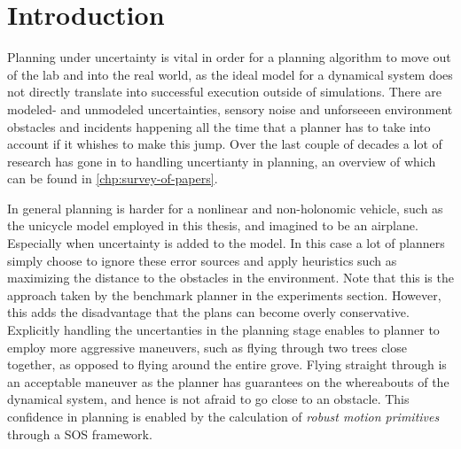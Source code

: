 \chapter{Introduction}
\label{sec:intro}

Planning under uncertainty is vital in order for a planning algorithm to move
out of the lab and into the real world, as the ideal model for a dynamical
system does not directly translate into successful execution outside of
simulations. There are modeled- and unmodeled uncertainties, sensory noise and
unforseeen environment obstacles and incidents happening all the time that a
planner has to take into account if it whishes to make this jump. Over the last
couple of decades a lot of research has gone in to handling uncertianty in
planning, an overview of which can be found in \cref{chp:survey-of-papers}.

In general planning is harder for a nonlinear and non-holonomic vehicle, such as
the unicycle model employed in this thesis, and imagined to be an airplane.
Especially when uncertainty is added to the model. In this case a lot of
planners simply choose to ignore these error sources and apply heuristics such
as maximizing the distance to the obstacles in the environment. Note that this
is the approach taken by the benchmark planner in the experiments section.
However, this adds the disadvantage that the plans can become overly
conservative. Explicitly handling the uncertanties in the planning stage enables
to planner to employ more aggressive maneuvers, such as flying through two trees
close together, as opposed to flying around the entire grove. Flying straight
through is an acceptable maneuver as the planner has guarantees on the
whereabouts of the dynamical system, and hence is not afraid to go close to an
obstacle. This confidence in planning is enabled by the calculation of
\textit{robust motion primitives} through a \ac{SOS} framework.

